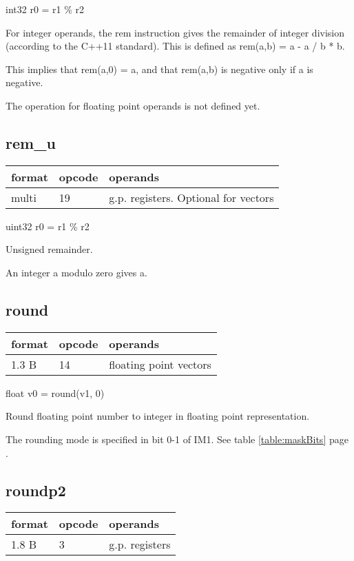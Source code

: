 \documentclass[forwardcom.tex]{subfiles}
\begin{document}
int32 r0 = r1 \% r2
\vv

For integer operands, the rem instruction gives the remainder of integer division (according to the C++11 standard). 
This is defined as rem(a,b) = a - a / b * b. 

This implies that rem(a,0) = a, and that rem(a,b) is negative only if a is negative.
\vv

The operation for floating point operands is not defined yet. 
\vv


\subsection{rem\_u}
\label{table:remUInstruction}
\begin{tabular}{|p{12mm}|p{15mm}|p{100mm}|}
\hline
\bfseries format & \bfseries opcode & \bfseries operands \\ \hline
multi & 19 & g.p. registers. Optional for vectors \\ \hline
\end{tabular}
\vv

uint32 r0 = r1 \% r2
\vv

Unsigned remainder.
\vv

An integer a modulo zero gives a.
\vv


\subsection{round}
\label{table:roundInstruction}
\begin{tabular}{|p{12mm}|p{15mm}|p{100mm}|}
\hline
\bfseries format & \bfseries opcode & \bfseries operands \\ \hline
1.3 B & 14 & floating point vectors \\ \hline
\end{tabular}
\vv

float v0 = round(v1, 0)
\vv

Round floating point number to integer in floating point representation.
\vv

The rounding mode is specified in bit 0-1 of IM1. See table \ref{table:maskBits} page \pageref{table:maskBits}.
\vv


\subsection{roundp2}
\label{table:roundP2Instruction}
\begin{tabular}{|p{12mm}|p{15mm}|p{100mm}|}
\hline
\bfseries format & \bfseries opcode & \bfseries operands \\ \hline
1.8 B &  3 & g.p. registers \\ \hline
\end{tabular}
\vv
\end{document}
